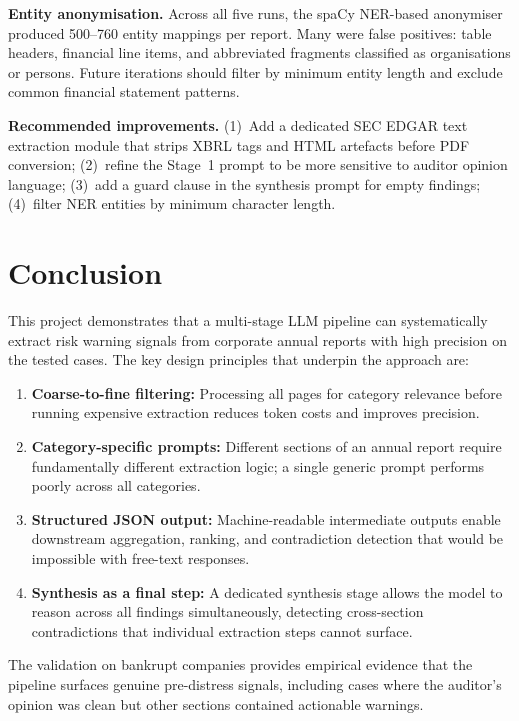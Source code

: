 \documentclass[12pt,a4paper]{article}
\begin{document}
\textbf{Entity anonymisation.}
Across all five runs, the spaCy NER-based anonymiser produced 500--760
entity mappings per report. Many were false positives: table headers,
financial line items, and abbreviated fragments classified as organisations
or persons. Future iterations should filter by minimum entity length and
exclude common financial statement patterns.

\textbf{Recommended improvements.}
(1)~Add a dedicated SEC EDGAR text extraction module that strips XBRL tags
and HTML artefacts before PDF conversion; (2)~refine the Stage~1 prompt to
be more sensitive to auditor opinion language; (3)~add a guard clause in the
synthesis prompt for empty findings; (4)~filter NER entities by minimum
character length.

\section{Conclusion}

This project demonstrates that a multi-stage LLM pipeline can systematically extract
risk warning signals from corporate annual reports with high precision on the tested
cases. The key design principles that underpin the approach are:

\begin{enumerate}[leftmargin=1.5cm]
  \item \textbf{Coarse-to-fine filtering:} Processing all pages for category relevance
    before running expensive extraction reduces token costs and improves precision.
  \item \textbf{Category-specific prompts:} Different sections of an annual report
    require fundamentally different extraction logic; a single generic prompt
    performs poorly across all categories.
  \item \textbf{Structured JSON output:} Machine-readable intermediate outputs
    enable downstream aggregation, ranking, and contradiction detection that would
    be impossible with free-text responses.
  \item \textbf{Synthesis as a final step:} A dedicated synthesis stage allows the
    model to reason across all findings simultaneously, detecting cross-section
    contradictions that individual extraction steps cannot surface.
\end{enumerate}

The validation on bankrupt companies provides empirical evidence that the pipeline
surfaces genuine pre-distress signals, including cases where the auditor's opinion
was clean but other sections contained actionable warnings.
\end{document}
